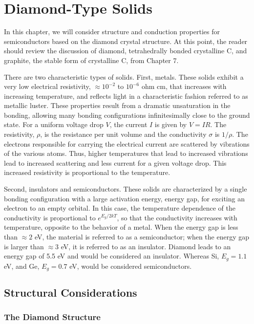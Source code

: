 \chapter{Diamond-Type Solids}

In this chapter, we will consider structure and conduction properties 
for semiconductors based on the diamond crystal structure.  At this 
point, the reader should review the discussion of diamond, 
tetrahedrally bonded crystalline C, and graphite, the stable form of 
crystalline C, from Chapter 7.

There are two characteristic types of solids.  First, metals.  
These solids exhibit a very low electrical resistivity, $\approx 
10^{-2}$ to $10^{-6}$ ohm cm, that increases with increasing temperature, 
and reflects light in a characteristic fashion referred to as metallic 
luster. These properties result from a dramatic unsaturation in the
bonding, allowing many bonding configurations infinitesimally close to the 
ground state.  For a uniform voltage drop $V$, the current $I$ is given by 
$V = IR$. The resistivity, $\rho$, is the resistance
per unit volume and the conductivity $\sigma$ is $1/ \rho$.  The electrons 
responsible for carrying the electrical current are scattered by vibrations 
of the various atoms. Thus, higher temperatures that
lead to increased vibrations lead to increased scattering and less current 
for a given voltage drop.  This increased resistivity is proportional to 
the temperature.

Second, insulators and semiconductors.  These solids are characterized by a
single bonding configuration with a large activation energy, energy
gap, for exciting an electron to an empty orbital.  In this case, the
temperature dependence of the conductivity is proportional to
$e^{E_g/2kT}$, so that the conductivity increases with temperature,
opposite to the behavior of a metal.  When the energy gap is less 
than $\approx 2$ eV, the material is referred to as a semiconductor; 
when the energy gap is larger than $\approx 3$ eV, it is referred to 
as an insulator.  Diamond leads to an energy gap of 5.5 eV and would 
be considered an insulator.  Whereas Si, $E_g = 1.1$ eV, and Ge, $E_g = 
0.7$ eV, would be considered semiconductors.

\section{Structural Considerations}

\subsection{The Diamond Structure}

